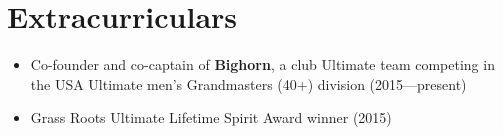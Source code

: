 \section{Extracurriculars}
\vspace{0.5em}

\begin{itemize}
  \item Co-founder and co-captain of \textbf{Bighorn}, a club Ultimate
    team competing in the USA Ultimate men's Grandmasters (40+)
    division (2015---present)
  \item Grass Roots Ultimate Lifetime Spirit Award winner (2015)
\end{itemize}
